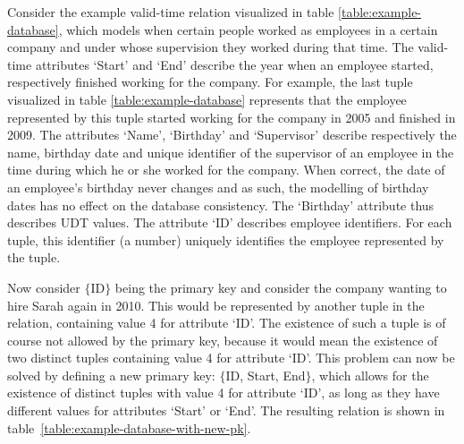 \begin{example}
\label{ex:pk}
Consider the example valid-time relation visualized in table \ref{table:example-database}, which models when certain people worked as employees in a certain company and under whose supervision they worked during that time. The valid-time attributes `Start' and `End' describe the year when an employee started, respectively finished working for the company. For example, the last tuple visualized in table \ref{table:example-database} represents that the employee represented by this tuple started working for the company in 2005 and finished in 2009. The attributes `Name', `Birthday' and `Supervisor' describe respectively the name, birthday date and unique identifier of the supervisor of an employee in the time during which he or she worked for the company. When correct, the date of an employee's birthday never changes and as such, the modelling of birthday dates has no effect on the database consistency. The `Birthday' attribute thus describes UDT values. The attribute `ID' describes employee identifiers. For each tuple, this identifier (a number) uniquely identifies the employee represented by the tuple. 

Now consider $\{$ID$\}$ being the primary key and consider the company wanting to hire Sarah again in 2010. This would be represented by another tuple in the relation, containing value 4 for attribute `ID'. The existence of such a tuple is of course not allowed by the primary key, because it would mean the existence of two distinct tuples containing value 4 for attribute `ID'. This problem can now be solved by defining a new primary key: $\{$ID, Start, End$\}$, which allows for the existence of distinct tuples with value 4 for attribute `ID', as long as they have different values for attributes `Start' or `End'. The resulting relation is shown in table~\ref{table:example-database-with-new-pk}.

\end{example}
